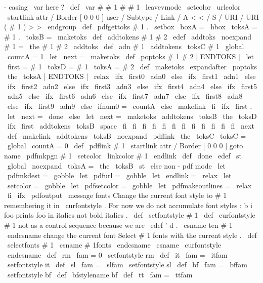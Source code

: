 {{{-
casing
\
var
here
?
\
def
\
var
#
#
1
{
#
#
1
}
%
%
\
leavevmode
\
setcolor
{
\
urlcolor
}
%
\
startlink
attr
{
/
Border
[
0
0
0
]
}
%
user
{
/
Subtype
/
Link
/
A
<
<
/
S
/
URI
/
URI
(
#
1
)
>
>
}
%
\
endgroup
}
\
def
\
pdfgettoks
#
1
.
{
\
setbox
\
boxA
=
\
hbox
{
\
toksA
=
{
#
1
.
}
\
toksB
=
{
}
\
maketoks
}
}
\
def
\
addtokens
#
1
#
2
{
\
edef
\
addtoks
{
\
noexpand
#
1
=
{
\
the
#
1
#
2
}
}
\
addtoks
}
\
def
\
adn
#
1
{
\
addtokens
{
\
toksC
}
{
#
1
}
\
global
\
countA
=
1
\
let
\
next
=
\
maketoks
}
\
def
\
poptoks
#
1
#
2
|
ENDTOKS
|
{
\
let
\
first
=
#
1
\
toksD
=
{
#
1
}
\
toksA
=
{
#
2
}
}
\
def
\
maketoks
{
%
\
expandafter
\
poptoks
\
the
\
toksA
|
ENDTOKS
|
\
relax
\
ifx
\
first0
\
adn0
\
else
\
ifx
\
first1
\
adn1
\
else
\
ifx
\
first2
\
adn2
\
else
\
ifx
\
first3
\
adn3
\
else
\
ifx
\
first4
\
adn4
\
else
\
ifx
\
first5
\
adn5
\
else
\
ifx
\
first6
\
adn6
\
else
\
ifx
\
first7
\
adn7
\
else
\
ifx
\
first8
\
adn8
\
else
\
ifx
\
first9
\
adn9
\
else
\
ifnum0
=
\
countA
\
else
\
makelink
\
fi
\
ifx
\
first
.
\
let
\
next
=
\
done
\
else
\
let
\
next
=
\
maketoks
\
addtokens
{
\
toksB
}
{
\
the
\
toksD
}
\
ifx
\
first
\
addtokens
{
\
toksB
}
{
\
space
}
\
fi
\
fi
\
fi
\
fi
\
fi
\
fi
\
fi
\
fi
\
fi
\
fi
\
fi
\
fi
\
next
}
\
def
\
makelink
{
\
addtokens
{
\
toksB
}
%
{
\
noexpand
\
pdflink
{
\
the
\
toksC
}
}
\
toksC
=
{
}
\
global
\
countA
=
0
}
\
def
\
pdflink
#
1
{
%
\
startlink
attr
{
/
Border
[
0
0
0
]
}
goto
name
{
\
pdfmkpgn
{
#
1
}
}
\
setcolor
{
\
linkcolor
}
#
1
\
endlink
}
\
def
\
done
{
\
edef
\
st
{
\
global
\
noexpand
\
toksA
=
{
\
the
\
toksB
}
}
\
st
}
\
else
%
non
-
pdf
mode
\
let
\
pdfmkdest
=
\
gobble
\
let
\
pdfurl
=
\
gobble
\
let
\
endlink
=
\
relax
\
let
\
setcolor
=
\
gobble
\
let
\
pdfsetcolor
=
\
gobble
\
let
\
pdfmakeoutlines
=
\
relax
\
fi
%
\
ifx
\
pdfoutput
\
message
{
fonts
}
%
Change
the
current
font
style
to
#
1
remembering
it
in
\
curfontstyle
.
%
For
now
we
do
not
accumulate
font
styles
:
b
{
i
{
foo
}
}
prints
foo
in
%
italics
not
bold
italics
.
%
\
def
\
setfontstyle
#
1
{
%
\
def
\
curfontstyle
{
#
1
}
%
not
as
a
control
sequence
because
we
are
\
edef
'
d
.
\
csname
ten
#
1
\
endcsname
%
change
the
current
font
}
%
Select
#
1
fonts
with
the
current
style
.
%
\
def
\
selectfonts
#
1
{
\
csname
#
1fonts
\
endcsname
\
csname
\
curfontstyle
\
endcsname
}
\
def
\
rm
{
\
fam
=
0
\
setfontstyle
{
rm
}
}
\
def
\
it
{
\
fam
=
\
itfam
\
setfontstyle
{
it
}
}
\
def
\
sl
{
\
fam
=
\
slfam
\
setfontstyle
{
sl
}
}
\
def
\
bf
{
\
fam
=
\
bffam
\
setfontstyle
{
bf
}
}
\
def
\
bfstylename
{
bf
}
\
def
\
tt
{
\
fam
=
\
ttfam
}}}
